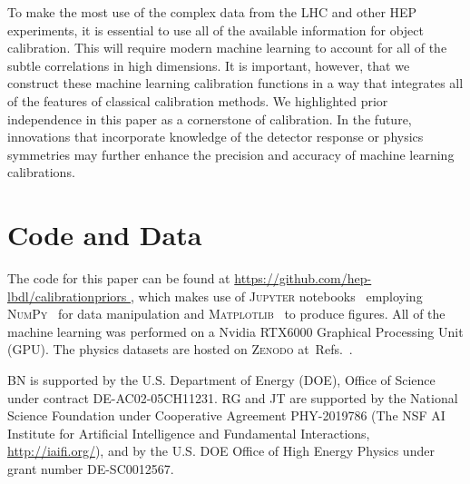 \documentclass[aps,prd,reprint,preprintnumbers,superscriptaddress,nofootinbib,longbibliography,floatfix]{revtex4-1}
\DeclareRobustCommand{\Refs}[1]{Refs.~\cite{#1}}
\begin{document}
To make the most use of the complex data from the LHC and other HEP experiments, it is essential to use all of the available information for object calibration.
%
This will require modern machine learning to account for all of the subtle correlations in high dimensions.
%
It is important, however, that we construct these machine learning calibration functions in a way that integrates all of the features of classical calibration methods.
%
We highlighted prior independence in this paper as a cornerstone of calibration.
%
In the future, innovations that incorporate knowledge of the detector response or physics symmetries may further enhance the precision and accuracy of machine learning calibrations.


\section*{Code and Data}

The code for this paper can be found at \url{https://github.com/hep-lbdl/calibrationpriors
}, which makes use of \textsc{Jupyter} notebooks~\cite{Kluyver:2016aa} employing \textsc{NumPy}~\cite{harris2020array} for data manipulation and \textsc{Matplotlib}~\cite{Hunter:2007} to produce figures. All of the machine learning was performed on a Nvidia RTX6000 Graphical Processing Unit (GPU).  The physics datasets are hosted on \textsc{Zenodo} at~\Refs{komiske_patrick_2019_3341502,komiske_patrick_2019_3341770,komiske_patrick_2019_3341772,nachman_benjamin_2021_5108967}. 

\vspace{5mm}

\begin{acknowledgments}

BN is supported by the U.S. Department of Energy (DOE), Office of Science under contract DE-AC02-05CH11231.
%
RG and JT are supported by the National Science Foundation under Cooperative Agreement PHY-2019786 (The NSF AI Institute for Artificial Intelligence and Fundamental Interactions, \url{http://iaifi.org/}), and by the U.S. DOE Office of High Energy Physics under grant number DE-SC0012567.

\end{acknowledgments}


\end{document}
